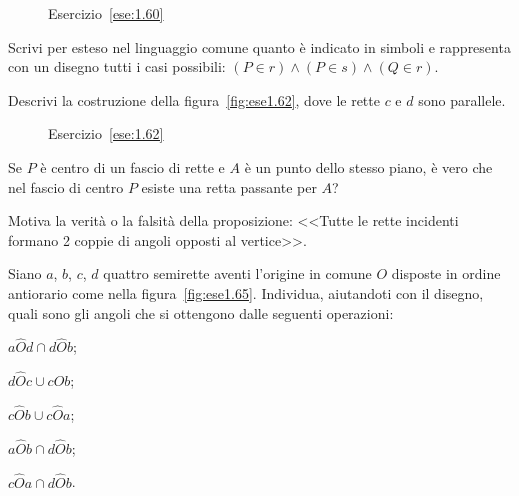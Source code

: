 \begin{inaccessibleblock}
 \begin{figure}[htb]
 \centering
 \caption{Esercizio~\ref{ese:1.60}}%
\end{figure}
\end{inaccessibleblock}

\begin{esercizio}
Scrivi per esteso nel linguaggio comune quanto è indicato in simboli 
e rappresenta con un disegno tutti i casi possibili: \((P\in r)\wedge 
(P\in s)\wedge (Q\in r)\).
\end{esercizio}

\begin{esercizio}
Descrivi la costruzione della figura~\ref{fig:ese1.62}, dove le rette 
\(c\) e \(d\) sono parallele.
\end{esercizio}


\begin{inaccessibleblock}
 \begin{figure}[htb]
 \centering
 \caption{Esercizio~\ref{ese:1.62}}%
\end{figure}
\end{inaccessibleblock}
 
\begin{esercizio}
Se \(P\) è centro di un fascio di rette e \(A\) è un punto dello stesso 
piano, è vero che nel fascio di centro \(P\) esiste una retta passante 
per \(A\)?
\end{esercizio}

\begin{esercizio}
Motiva la verità o la falsità della proposizione: <<Tutte le rette 
incidenti formano 2 coppie di angoli opposti al vertice>>.
\end{esercizio}

\begin{esercizio}
Siano \(a\), \(b\), \(c\), \(d\) quattro semirette aventi l'origine in comune 
\(O\) disposte in ordine antiorario come nella 
figura~\ref{fig:ese1.65}. Individua, aiutandoti con il disegno, quali 
sono gli angoli che si ottengono dalle seguenti operazioni:
\begin{multicols}{3}
\begin{enumeratea}
\item \(a\widehat{O}d \cap d\widehat{O}b\);
\item \(d\widehat{O}c \cup c\widehat{O}b\);
\item \(c\widehat{O}b \cup c\widehat{O}a\);
\item \(a\widehat{O}b \cap d\widehat{O}b\);
\item \(c\widehat{O}a \cap d\widehat{O}b\).
\end{enumeratea}
\end{multicols}
\end{esercizio}


